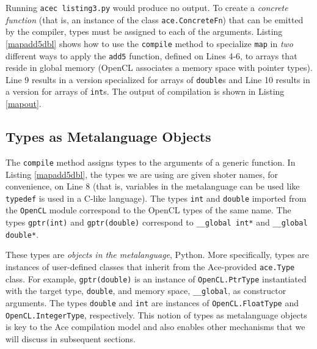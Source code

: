 \documentclass{sig-alternate}
\begin{document}
Running \verb|acec listing3.py| would produce no output. To create a {\em concrete function} (that is, an instance of the class \verb|ace.ConcreteFn|) that can be emitted by the compiler, types must be assigned to each of the arguments. Listing \ref{mapadd5dbl} shows how to use the \verb|compile| method to specialize \verb|map| in \emph{two} different ways to apply the \verb|add5| function, defined on Lines 4-6, to arrays  that reside in global memory (OpenCL associates a memory space with pointer types). Line 9 results in a version specialized for arrays of \verb|double|s and Line 10 results in a version for arrays of \verb|int|s. The output of compilation is shown in Listing \ref{mapout}.

\subsection{Types as Metalanguage Objects}
The \verb|compile| method assigns types to the arguments of a generic function. In Listing \ref{mapadd5dbl}, the types we are using are given shoter names, for convenience, on Line 8 (that is, variables in the metalanguage can be used like \verb|typedef| is used in a C-like language). The types \verb|int| and \verb|double| imported from the \verb|OpenCL| module correspond to the OpenCL types of the same name. The types \verb|gptr(int)| and \verb|gptr(double)| correspond to \verb|__global int*| and \verb|__global double*|.

These types are \emph{objects in the metalanguage}, Python. More specifically, types are {instances} of user-defined classes that inherit from the Ace-provided \verb|ace.Type| class. For example, \verb|gptr(double)| is an instance of \verb|OpenCL.PtrType| instantiated with the target type, \verb|double|, and memory space, \verb|__global|, as constructor arguments. The types \verb|double| and \verb|int| are instances of \verb|OpenCL.FloatType| and \verb|OpenCL.IntegerType|, respectively. This notion of types as metalanguage objects is key to the Ace compilation model and also enables other mechanisms that we will discuss in subsequent sections.
\end{document}
